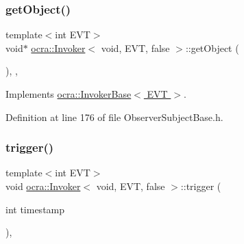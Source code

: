\hypertarget{classocra_1_1Invoker_3_01void_00_01EVT_00_01false_01_4_a2d32f4dcaca9ae526b89e28cf2a3fc70}{}\label{classocra_1_1Invoker_3_01void_00_01EVT_00_01false_01_4_a2d32f4dcaca9ae526b89e28cf2a3fc70} 
\subsubsection{\texorpdfstring{get\+Object()}{getObject()}}
{\footnotesize\ttfamily template$<$int E\+VT$>$ \\
void$\ast$ \hyperlink{classocra_1_1Invoker}{ocra\+::\+Invoker}$<$ void, E\+VT, false $>$\+::get\+Object (\begin{DoxyParamCaption}{ }\end{DoxyParamCaption})\hspace{0.3cm}{\ttfamily [inline]}, {\ttfamily [protected]}, {\ttfamily [virtual]}}



Implements \hyperlink{classocra_1_1InvokerBase_a90d81926209cb3119933412f742bc245}{ocra\+::\+Invoker\+Base$<$ E\+V\+T $>$}.



Definition at line 176 of file Observer\+Subject\+Base.\+h.

\hypertarget{classocra_1_1Invoker_3_01void_00_01EVT_00_01false_01_4_a483d45eb6e668e5c97b9861840f4d6ea}{}\label{classocra_1_1Invoker_3_01void_00_01EVT_00_01false_01_4_a483d45eb6e668e5c97b9861840f4d6ea} 
\subsubsection{\texorpdfstring{trigger()}{trigger()}}
{\footnotesize\ttfamily template$<$int E\+VT$>$ \\
void \hyperlink{classocra_1_1Invoker}{ocra\+::\+Invoker}$<$ void, E\+VT, false $>$\+::trigger (\begin{DoxyParamCaption}\item[{int}]{timestamp }\end{DoxyParamCaption})\hspace{0.3cm}{\ttfamily [inline]}, {\ttfamily [virtual]}}


